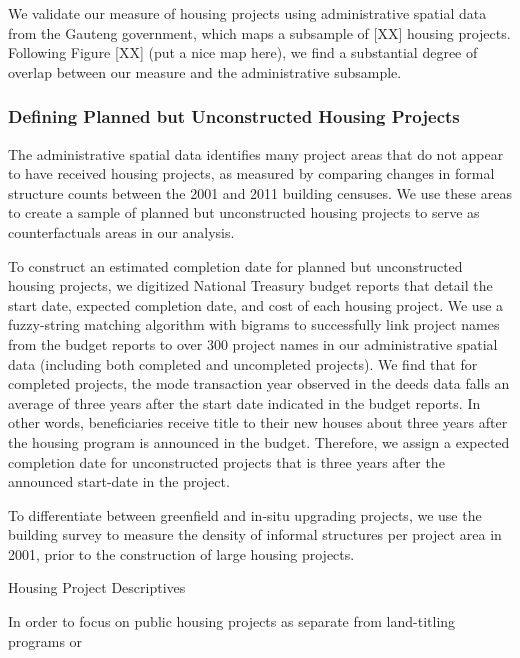 \documentclass[12pt]{article}
\begin{document}
We validate our measure of housing projects using administrative spatial data from the Gauteng government, which maps a subsample of [XX] housing projects.  Following Figure [XX] (put a nice map here), we find a substantial degree of overlap between our measure and the administrative subsample.  

\subsubsection{Defining Planned but Unconstructed Housing Projects}

The administrative spatial data identifies many project areas that do not appear to have received housing projects, as measured by comparing changes in formal structure counts between the 2001 and 2011 building censuses.  We use these areas to create a sample of planned but unconstructed housing projects to serve as counterfactuals areas in our analysis.

To construct an estimated completion date for planned but unconstructed housing projects, we digitized National Treasury budget reports that detail the start date, expected completion date, and cost of each housing project.  We use a fuzzy-string matching algorithm with bigrams to successfully link project names from the budget reports to over 300 project names in our administrative spatial data (including both completed and uncompleted projects).  We find that for completed projects, the mode transaction year observed in the deeds data falls an average of three years after the start date indicated in the budget reports.  In other words, beneficiaries receive title to their new houses about three years after the housing program is announced in the budget.  Therefore, we assign a expected completion date for unconstructed projects that is three years after the announced start-date in the project.

To differentiate between greenfield and in-situ upgrading projects, we use the building survey to measure the density of informal structures per project area in 2001, prior to the construction of large housing projects.



\begin{table}
	\centering
	\caption{Housing Project Descriptives}\label{table:projectdescriptives}

\end{table}

In order to focus on public housing projects as separate from land-titling programs or 
\end{document}
